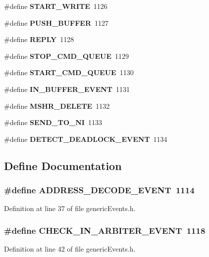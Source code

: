\begin{CompactItemize}
\item 
\#define {\bf START\_\-WRITE}~1126
\item 
\#define {\bf PUSH\_\-BUFFER}~1127
\item 
\#define {\bf REPLY}~1128
\item 
\#define {\bf STOP\_\-CMD\_\-QUEUE}~1129
\item 
\#define {\bf START\_\-CMD\_\-QUEUE}~1130
\item 
\#define {\bf IN\_\-BUFFER\_\-EVENT}~1131
\item 
\#define {\bf MSHR\_\-DELETE}~1132
\item 
\#define {\bf SEND\_\-TO\_\-NI}~1133
\item 
\#define {\bf DETECT\_\-DEADLOCK\_\-EVENT}~1134
\end{CompactItemize}


\subsection{Define Documentation}
\subsubsection[{ADDRESS\_\-DECODE\_\-EVENT}]{\setlength{\rightskip}{0pt plus 5cm}\#define ADDRESS\_\-DECODE\_\-EVENT~1114}\label{genericEvents_8h_7c3a9d935be563506b3454e5a5ccb79c}




Definition at line 37 of file genericEvents.h.
\subsubsection[{CHECK\_\-IN\_\-ARBITER\_\-EVENT}]{\setlength{\rightskip}{0pt plus 5cm}\#define CHECK\_\-IN\_\-ARBITER\_\-EVENT~1118}\label{genericEvents_8h_efcf8c8202abbff075205dd855c7b923}




Definition at line 42 of file genericEvents.h.
